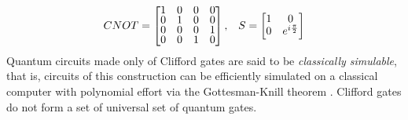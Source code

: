 \begin{align}
    \label{CNOT}
    CNOT = 
    \renewcommand{\arraystretch}{0.75}
    \begin{bmatrix}
        1 & 0 & 0 & 0 \\
        0 & 1 & 0 & 0 \\
        0 & 0 & 0 & 1 \\
        0 & 0 & 1 & 0 
    \end{bmatrix}, 
    && S = 
    \begin{bmatrix}
        1 & 0 \\
        0 & e^{i\frac{\pi}{2}}
    \end{bmatrix}
\end{align}
Quantum circuits made only of Clifford gates are said to be \textit{classically simulable}, that is, circuits of this construction can be efficiently 
simulated on a classical computer with polynomial effort via the Gottesman-Knill theorem \cite{knillGottesman}. Clifford gates do not form 
a set of universal set of quantum gates.


